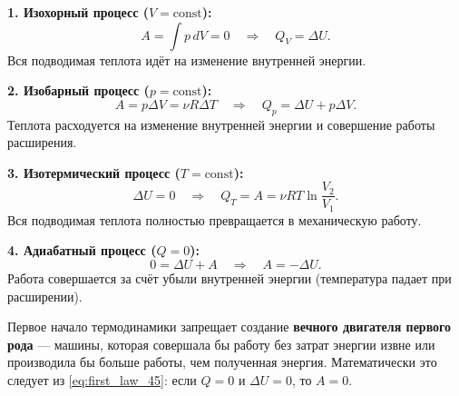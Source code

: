 \begin{theorem}
\textbf{1. Изохорный процесс ($V = \text{const}$):}
\begin{equation}
    A = \int p \, dV = 0 \quad \Rightarrow \quad Q_V = \Delta U. \label{eq:isochoric_45}
\end{equation}
Вся подводимая теплота идёт на изменение внутренней энергии.

\textbf{2. Изобарный процесс ($p = \text{const}$):}
\begin{equation}
    A = p \Delta V = \nu R \Delta T \quad \Rightarrow \quad Q_p = \Delta U + p \Delta V. \label{eq:isobaric_45}
\end{equation}
Теплота расходуется на изменение внутренней энергии и совершение работы расширения.

\textbf{3. Изотермический процесс ($T = \text{const}$):}
\begin{equation}
    \Delta U = 0 \quad \Rightarrow \quad Q_T = A = \nu R T \ln \frac{V_2}{V_1}. \label{eq:isothermal_45}
\end{equation}
Вся подводимая теплота полностью превращается в механическую работу.

\textbf{4. Адиабатный процесс ($Q = 0$):}
\begin{equation}
    0 = \Delta U + A \quad \Rightarrow \quad A = -\Delta U. \label{eq:adiabatic_45}
\end{equation}
Работа совершается за счёт убыли внутренней энергии (температура падает при расширении).
\end{theorem}

\begin{remark}
Первое начало термодинамики запрещает создание \textbf{вечного двигателя первого рода} --- машины, которая совершала бы работу без затрат энергии извне или производила бы больше работы, чем полученная энергия. Математически это следует из \eqref{eq:first_law_45}: если $Q = 0$ и $\Delta U = 0$, то $A = 0$.
\end{remark}

